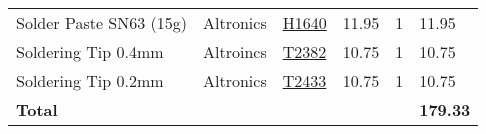 \documentclass[a4paper,landscape]{article}
\begin{document}
\begin{tabular}{llllll}
Solder Paste SN63 (15g)
    & Altronics
    & \href{http://www.altronics.com.au/p/h1640-sn63-pb37-solder-paste-15g-syringe/}{H1640}
    & 11.95 & 1 & 11.95 \\

Soldering Tip 0.4mm
    & Altroincs
    & \href{http://www.altronics.com.au/p/t2382-micron-0.4mm-round-tip-to-suit-t2380/}{T2382}
    & 10.75 & 1 & 10.75 \\

Soldering Tip 0.2mm
    & Altronics
    & \href{http://www.altronics.com.au/p/t2433-micron-0.2mm-conical-tip-to-suit-t2442-t2438/}{T2433}
    & 10.75 & 1 & 10.75 \\

    \hline\hline
    \multicolumn{5}{l}{\textbf{Total}} & \textbf{179.33}\\%
    \hline
    \end{tabular}
\end{document}
